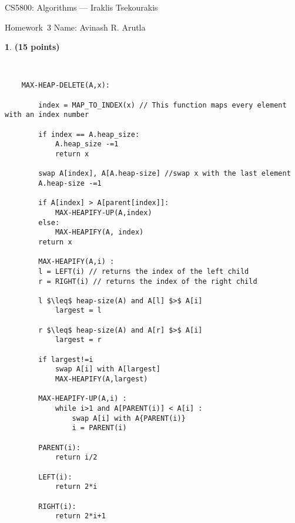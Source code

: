 \documentclass[11pt]{article}
\newcommand{\yourname}{Avinash R. Arutla}
\theoremstyle{definition}
\newcommand{\instructor}{Iraklis Tsekourakis}
\newcommand{\hwnum}{3}
\newtheorem{prob}{}
\newcommand{\solution}{\medskip\noindent{\color{DarkBlue}\textbf{Solution:}}}
\begin{document}
{\Large
\begin{center}{CS5800: Algorithms} --- \instructor \end{center}}
{\large
\vspace{10pt}
\noindent Homework~\hwnum \vspace{2pt}%
}
\bigskip
{\large \noindent Name: \yourname }
\vspace{15pt}





 
\begin{prob} \textbf{(15 points)}
\end{prob}
\solution \\
\begin{verbatim}
    MAX-HEAP-DELETE(A,x):

        index = MAP_TO_INDEX(x) // This function maps every element with an index number

        if index == A.heap_size:
            A.heap_size -=1
            return x
        
        swap A[index], A[A.heap-size] //swap x with the last element
        A.heap-size -=1

        if A[index] > A[parent[index]]:
            MAX-HEAPIFY-UP(A,index)
        else:
            MAX-HEAPIFY(A, index)
        return x

        MAX-HEAPIFY(A,i) : 
        l = LEFT(i) // returns the index of the left child
        r = RIGHT(i) // returns the index of the right child
    
        l $\leq$ heap-size(A) and A[l] $>$ A[i]
            largest = l
    
        r $\leq$ heap-size(A) and A[r] $>$ A[i]
            largest = r
    
        if largest!=i
            swap A[i] with A[largest]
            MAX-HEAPIFY(A,largest)

        MAX-HEAPIFY-UP(A,i) : 
            while i>1 and A[PARENT(i)] < A[i] :
                swap A[i] with A{PARENT(i)}
                i = PARENT(i)
        
        PARENT(i):
            return i/2

        LEFT(i):
            return 2*i

        RIGHT(i):
            return 2*i+1
\end{verbatim}
\end{document}
